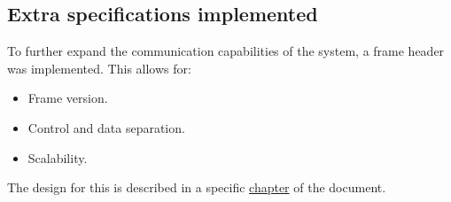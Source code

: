\subsection{Extra specifications implemented}

To further expand the communication capabilities of the system, a frame header was implemented. This allows for:
\begin{itemize}
    \item Frame version.
    \item Control and data separation.
    \item Scalability.
\end{itemize}

The design for this is described in a specific \hyperref[header]{chapter} of the document.
